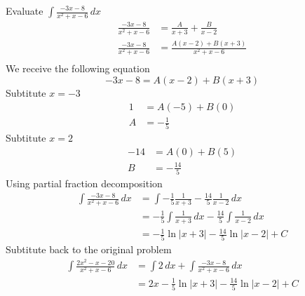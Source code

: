 \documentclass[12pt]{article}
\begin{document}
\begin{enumerate}
Evaluate $\displaystyle\int\frac{-3x-8}{x^{2}+x-6}\,dx$
\begin{equation*}
  \begin{aligned}
  \frac{-3x-8}{x^{2}+x-6}&=\frac{A}{x+3}+\frac{B}{x-2}\\
  \frac{-3x-8}{x^{2}+x-6}&=\frac{A(x-2)+B(x+3)}{x^{2}+x-6}\\
  \end{aligned}
\end{equation*}
We receive the following equation
$$-3x-8=A(x-2)+B(x+3)$$
Subtitute $x = -3$
\begin{equation*}
  \begin{aligned}
  1&=A(-5)+B(0)\\
  A&=-\frac{1}{5}
  \end{aligned}
\end{equation*}
Subtitute $x = 2$
\begin{equation*}
  \begin{aligned}
  -14&=A(0)+B(5)\\
  B&=-\frac{14}{5}
  \end{aligned}
\end{equation*}
Using partial fraction decomposition
\begin{equation*}
  \begin{aligned}
  \int\frac{-3x-8}{x^{2}+x-6}\,dx&=\int-\frac{1}{5}\frac{1}{x+3}-\frac{14}{5}\frac{1}{x-2}\,dx\\
  &=-\frac{1}{5}\int\frac{1}{x+3}\,dx-\frac{14}{5}\int\frac{1}{x-2}\,dx\\
  &=-\frac{1}{5}\ln|x+3|-\frac{14}{5}\ln|x-2|+C
  \end{aligned}
\end{equation*}
Subtitute back to the original problem
\begin{equation}
  \begin{aligned}
  \int\frac{2x^{2}-x-20}{x^{2}+x-6}\,dx&=\int{2}\,dx+\int\frac{-3x-8}{x^2+x-6}\,dx\\
  &=2x-\frac{1}{5}\ln|x+3|-\frac{14}{5}\ln|x-2|+C
  \end{aligned}
\end{equation}
\end{enumerate}
\end{document}
